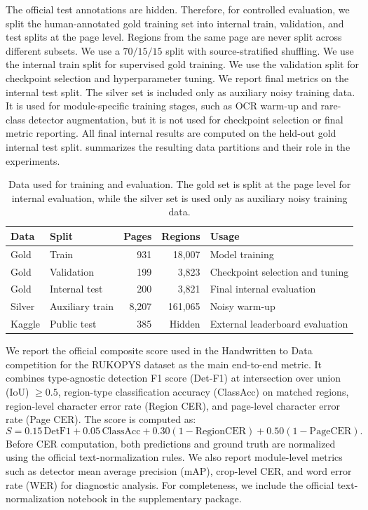 \documentclass[runningheads]{llncs}
\begin{document}
The official test annotations are hidden. Therefore, for controlled evaluation, we split the human-annotated gold training set into internal train, validation, and test splits at the page level. Regions from the same page are never split across different subsets. We use a $70/15/15$ split with source-stratified shuffling. We use the internal train split for supervised gold training. We use the validation split for checkpoint selection and hyperparameter tuning. We report final metrics on the internal test split. The silver set is included only as auxiliary noisy training data. It is used for module-specific training stages, such as OCR warm-up and rare-class detector augmentation, but it is not used for checkpoint selection or final metric reporting. All final internal results are computed on the held-out gold internal test split.  summarizes the resulting data partitions and their role in the experiments.

\begin{table}[tb]
  \caption{Data used for training and evaluation. The gold set is split at the page level for internal evaluation, while the silver set is used only as auxiliary noisy training data.}
  \label{tab:dataset-splits}
  \centering
  \begingroup
  \footnotesize
  \setlength{\tabcolsep}{8pt}
  \renewcommand{\arraystretch}{1.05}
  \begin{tabularx}{\linewidth}{@{}llrr>{\raggedright\arraybackslash}X@{}}
    \toprule
    Data & Split & Pages & Regions & Usage \\
    \midrule
    Gold & Train & 931 & 18,007 & Model training \\
    Gold & Validation & 199 & 3,823 & Checkpoint selection and tuning \\
    Gold & Internal test & 200 & 3,821 & Final internal evaluation \\
    Silver & Auxiliary train & 8,207 & 161,065 & Noisy warm-up \\
    Kaggle & Public test & 385 & Hidden & External leaderboard evaluation \\
    \bottomrule
  \end{tabularx}
  \endgroup
\end{table}

We report the official composite score used in the Handwritten to Data competition \cite{handwritten-to-data} for the RUKOPYS dataset as the main end-to-end metric. It combines type-agnostic detection F1 score (Det-F1) at intersection over union (IoU) $\geq 0.5$, region-type classification accuracy (ClassAcc) on matched regions, region-level character error rate (Region CER), and page-level character error rate (Page CER). The score is computed as:
\[
S = 0.15\,\mathrm{DetF1}
  + 0.05\,\mathrm{ClassAcc}
  + 0.30(1-\mathrm{RegionCER})
  + 0.50(1-\mathrm{PageCER}).
\]
Before CER computation, both predictions and ground truth are normalized using the official text-normalization rules. We also report module-level metrics such as detector mean average precision (mAP), crop-level CER, and word error rate (WER) for diagnostic analysis. For completeness, we include the official text-normalization notebook in the supplementary package.
\end{document}
